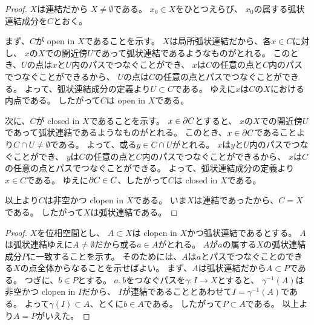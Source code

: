 \documentclass[report]{jlreq}
\begin{document}
\begin{proof}
    $X$は連結だから
    $X \neq \emptyset$である。
    $x_0 \in X$をひとつえらび、
    $x_0$の属する弧状連結成分を$C$とおく。

    まず、$C$が open in $X$であることを示す。
    $X$は局所弧状連結だから、各$x \in C$に対し、
    $x$の$X$での開近傍$U$であって弧状連結であるようなものがとれる。
    このとき、$U$の点は$x$と$U$内のパスでつなぐことができ、
    $x$は$C$の任意の点と$C$内のパスでつなぐことができるから、
    $U$の点は$C$の任意の点とパスでつなぐことができる。
    よって、弧状連結成分の定義より$U \subset C$である。
    ゆえに$x$は$C$の$X$における内点である。
    したがって$C$は open in $X$である。

    次に、$C$が closed in $X$であることを示す。
    $x \in \partial C$とすると、
    $x$の$X$での開近傍$U$であって弧状連結であるようなものがとれる。
    このとき、$x \in \partial C$であることより$C \cap U \neq \emptyset$である。
    よって、或る$y \in C \cap U$がとれる。
    $x$は$y$と$U$内のパスでつなぐことができ、
    $y$は$C$の任意の点と$C$内のパスでつなぐことができるから、
    $x$は$C$の任意の点とパスでつなぐことができる。
    よって、弧状連結成分の定義より$x \in C$である。
    ゆえに$\partial C \in C$、したがって$C$は closed in $X$である。

    以上より$C$は非空かつ clopen in $X$である。
    いま$X$は連結であったから、$C = X$である。
    したがって$X$は弧状連結である。
\end{proof}

\begin{definition}[弧状連結成分]
    \TODO{}
\end{definition}


\begin{proof}
    $X$を位相空間とし、
    $A \subset X$は clopen in $X$かつ弧状連結であるとする。
    $A$は弧状連結ゆえに$A \neq \emptyset$だから或る$a \in A$がとれる。
    $A$が$a$の属する$X$の弧状連結成分$P$に一致することを示す。
    そのためには、$A$は$a$とパスでつなぐことのできる$X$の点全体からなることを示せばよい。
    まず、$A$は弧状連結だから$A \subset P$である。
    つぎに、$b \in P$とする。
    $a, b$をつなぐパスを$\gamma \colon I \to X$とすると、
    $\gamma^{-1}(A)$は非空かつ clopen in $I$だから、
    $I$が連結であることとあわせて$I = \gamma^{-1}(A)$である。
    よって$\gamma(I) \subset A$、とくに$b \in A$である。
    したがって$P \subset A$である。
    以上より$A = P$がいえた。
\end{proof}
\end{document}
